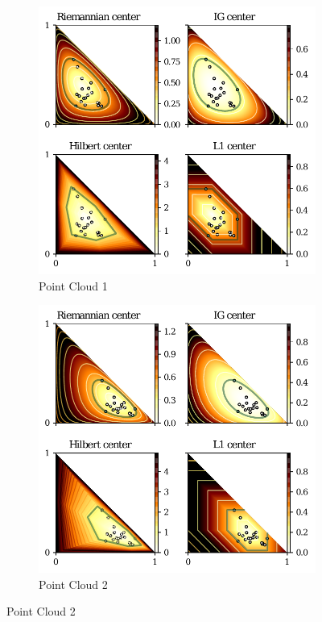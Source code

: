 \documentclass[graybox]{svmult}
\begin{document}
\begin{figure}[htb]
\centering
\begin{subfigure}[m]{.7\textwidth}
\includegraphics[width=\textwidth]{center1}%
\caption{Point Cloud 1}
\end{subfigure}
\begin{subfigure}[m]{.7\textwidth}
\includegraphics[width=\textwidth]{center2}%
\caption{Point Cloud 2}
\end{subfigure}
\end{figure}
\end{document}
